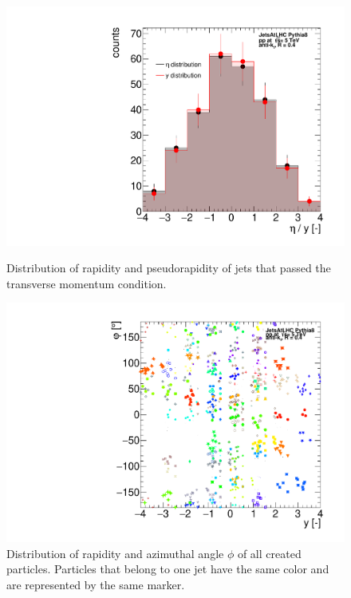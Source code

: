 \documentclass[a4paper,10pt]{article}
\begin{document}
\begin{figure}[htbp]
    \centering
    \begin{minipage}{0.45\textwidth}
        \centering
        \includegraphics[width=\textwidth]{figures/hJetEta.pdf}
        \caption{Distribution of rapidity and pseudorapidity of jets that passed the transverse momentum condition. }
        \label{f5}
    \end{minipage}\hfill
    \begin{minipage}{0.45\textwidth}
        \centering
        \includegraphics[width=\textwidth]{figures/hRapPhi.pdf}
        \caption{Distribution of rapidity and azimuthal angle $\phi$ of all created particles. Particles that belong to one jet have the same color and are represented by the same marker. }
        \label{f6}
    \end{minipage}
\end{figure}
\end{document}

